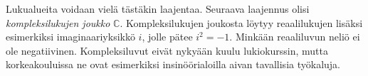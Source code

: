 
Lukualueita voidaan vielä tästäkin laajentaa. Seuraava laajennus olisi \emph{kompleksilukujen joukko} $\mathbb{C}$. Kompleksilukujen joukosta löytyy reaalilukujen lisäksi
esimerkiksi imaginaariyksikkö $i$, jolle pätee $i^2=-1$. Minkään
reaaliluvun neliö ei ole negatiivinen. Kompleksiluvut eivät
nykyään kuulu lukiokurssin, mutta korkeakouluissa ne ovat esimerkiksi insinöörialoilla aivan tavallisia työkaluja.
